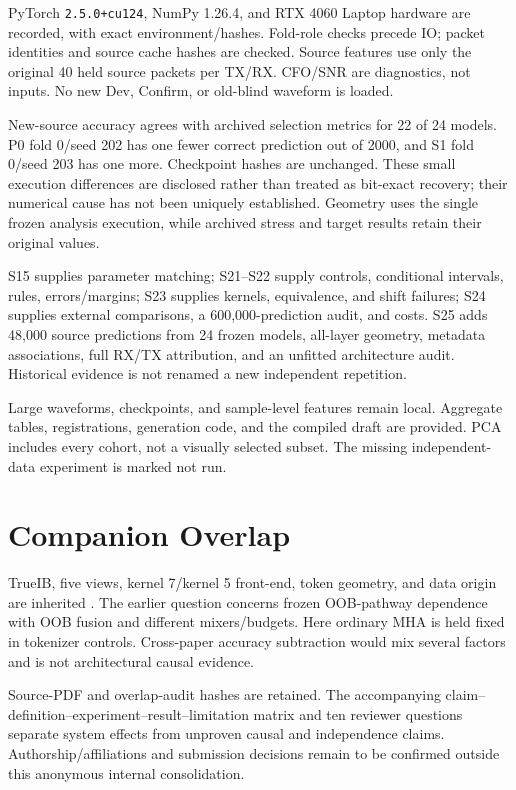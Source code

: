 \documentclass[journal]{IEEEtran}
\begin{document}
PyTorch \texttt{2.5.0+cu124}, NumPy 1.26.4, and RTX 4060 Laptop hardware are recorded, with exact environment/hashes. Fold-role checks precede IO; packet identities and source cache hashes are checked. Source features use only the original 40 held source packets per TX/RX. CFO/SNR are diagnostics, not inputs. No new Dev, Confirm, or old-blind waveform is loaded.

New-source accuracy agrees with archived selection metrics for 22 of 24 models. P0 fold 0/seed 202 has one fewer correct prediction out of 2000, and S1 fold 0/seed 203 has one more. Checkpoint hashes are unchanged. These small execution differences are disclosed rather than treated as bit-exact recovery; their numerical cause has not been uniquely established. Geometry uses the single frozen analysis execution, while archived stress and target results retain their original values.

S15 supplies parameter matching; S21--S22 supply controls, conditional intervals, rules, errors/margins; S23 supplies kernels, equivalence, and shift failures; S24 supplies external comparisons, a 600,000-prediction audit, and costs. S25 adds 48,000 source predictions from 24 frozen models, all-layer geometry, metadata associations, full RX/TX attribution, and an unfitted architecture audit. Historical evidence is not renamed a new independent repetition.

Large waveforms, checkpoints, and sample-level features remain local. Aggregate tables, registrations, generation code, and the compiled draft are provided. PCA includes every cohort, not a visually selected subset. The missing independent-data experiment is marked not run.

\section{Companion Overlap}
TrueIB, five views, kernel 7/kernel 5 front-end, token geometry, and data origin are inherited \cite{oobcompanion}. The earlier question concerns frozen OOB-pathway dependence with OOB fusion and different mixers/budgets. Here ordinary MHA is held fixed in tokenizer controls. Cross-paper accuracy subtraction would mix several factors and is not architectural causal evidence.

Source-PDF and overlap-audit hashes are retained. The accompanying claim--definition--experiment--result--limitation matrix and ten reviewer questions separate system effects from unproven causal and independence claims. Authorship/affiliations and submission decisions remain to be confirmed outside this anonymous internal consolidation.
\balance


\end{document}
